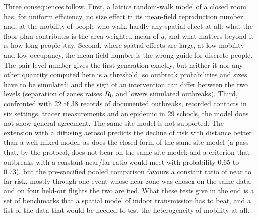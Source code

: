 Three consequences follow. First, a lattice random-walk model of a closed room has, for uniform efficiency, no
size effect in its mean-field reproduction number and, at the mobility of people who walk, hardly any spatial
effect at all: what the floor plan contributes is the area-weighted mean of $q$, and what matters beyond it is how
long people stay.
Second, where spatial effects are large, at low mobility and low occupancy, the mean-field number is the wrong
guide for discrete people. The pair-level number gives the first generation exactly, but neither it nor any other
quantity computed here is a threshold, so outbreak probabilities and sizes have to be simulated; and the sign of an
intervention can differ between the two levels (separation of zones raises $R_0$ and lowers simulated outbreaks).
Third, confronted with 22 of 38 records of documented outbreaks, recorded contacts in six settings, tracer
measurements and an epidemic in 29 schools, the model does not show general agreement. The same-site model is not
supported. The extension with a diffusing aerosol predicts the decline of risk with distance better than a
well-mixed model, as does the closed form of the same-site model (a pass that, by the protocol, does not bear on
the same-site model; and a criterion that outbreaks with a constant near/far ratio would meet with probability
0.65 to 0.73), but the pre-specified pooled comparison favours a constant ratio of near to far risk, mostly
through one event whose near zone was chosen on the same data, and on four held-out flights the two are tied. What
these tests give in the end is a set of benchmarks that a spatial model of indoor transmission has to beat, and a
list of the data that would be needed to test the heterogeneity of mobility at all.
